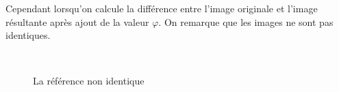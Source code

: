 \documentclass[a4paper,11pt]{article}
\begin{document}
Cependant lorsqu'on calcule la différence entre l'image originale et 
l'image résultante après ajout de la valeur $\varphi$. On remarque que 
les images ne sont pas identiques.

\begin{figure}[H]
  \begin{center}  
    \\
    \caption{La référence non identique}
  \end{center}
\end{figure}
\end{document}
